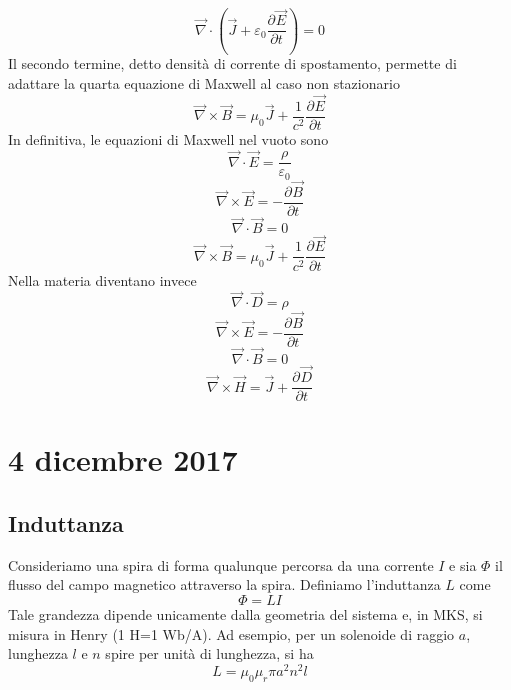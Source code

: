 \documentclass[a4paper,11pt]{book}
\let\oldnabla\nabla
\renewcommand{\nabla}{\vec{\oldnabla}}
\newcommand{\der}[3][]{\frac{\partial ^{#1}#2}{\partial #3^{#1}}}
\let\oldepsilon\epsilon
\let\oldvarepsilon\varepsilon
\renewcommand{\epsilon}{\oldvarepsilon}
\renewcommand{\varepsilon}{\oldepsilon}
\theoremstyle{definition}
\theoremstyle{theorem}
\begin{document}
\[\nabla\cdot\left(\vec{J}+\epsilon_0\der{\vec{E}}{t}\right)=0\]
Il secondo termine, detto densità di corrente di spostamento, permette di adattare la quarta equazione di Maxwell al caso non stazionario
\[\nabla\times\vec{B}=\mu_0\vec{J}+\frac{1}{c^2}\der{\vec{E}}{t}\]
In definitiva, le equazioni di Maxwell nel vuoto sono
\[\nabla\cdot\vec{E}=\frac{\rho}{\epsilon_0}\]\[
\nabla\times\vec{E}=-\der{\vec{B}}{t}\]\[
\nabla\cdot\vec{B}=0\]\[
\nabla\times\vec{B}=\mu_0\vec{J}+\frac{1}{c^2}\der{\vec{E}}{t}\]
Nella materia diventano invece
\[\nabla\cdot\vec{D}=\rho\]\[
\nabla\times\vec{E}=-\der{\vec{B}}{t}\]\[
\nabla\cdot\vec{B}=0\]\[
\nabla\times\vec{H}=\vec{J}+\der{\vec{D}}{t}\]
\section{4 dicembre 2017}
\subsection{Induttanza}
Consideriamo una spira di forma qualunque percorsa da una corrente $I$ e sia $\Phi$ il flusso del campo magnetico attraverso la spira. Definiamo l'induttanza $L$ come
\[\Phi=LI\]
Tale grandezza dipende unicamente dalla geometria del sistema e, in MKS, si misura in Henry (1 H=1 Wb/A). Ad esempio, per un solenoide di raggio $a$, lunghezza $l$ e $n$ spire per unità di lunghezza, si ha
\[L=\mu_0\mu_r\pi a^2n^2l\]
\end{document}

